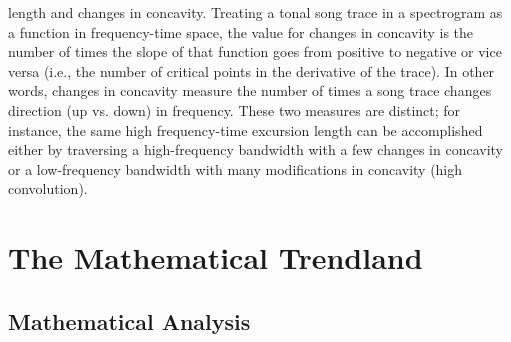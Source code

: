 \documentclass[11pt]{book}
\begin{document}
\begin{itemize}
length and changes in concavity. Treating a tonal song trace in a
spectrogram as a function in frequency-time space, the value for changes
in concavity is the number of times the slope of that function goes
from positive to negative or vice versa (i.e., the number of critical
points in the derivative of the trace). In other words, changes in
concavity measure the number of times a song trace changes direction
(up vs. down) in frequency. These two measures are distinct; for instance,
the same high frequency-time excursion length can be accomplished
either by traversing a high-frequency bandwidth with a few changes
in concavity or a low-frequency bandwidth with many modifications
in concavity (high convolution).
\end{itemize}

\chapter{The Mathematical Trendland}
\section{Mathematical Analysis}

\end{document}
